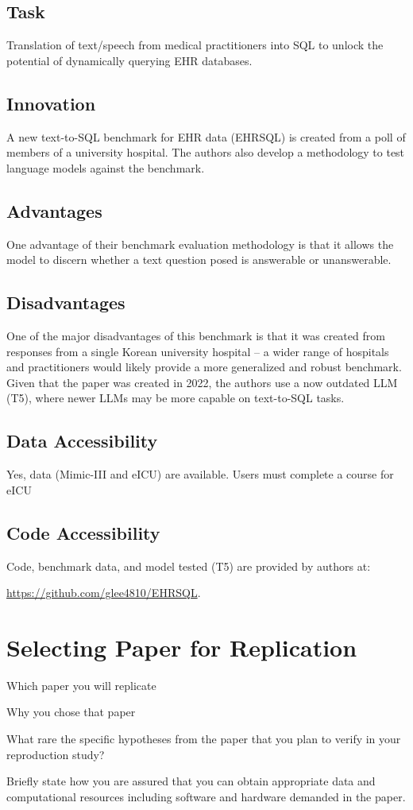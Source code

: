 \documentclass[
	letterpaper, %
]{jdf}
\begin{document}
\subsection{Task}
Translation of text/speech from medical practitioners into SQL to unlock the potential of dynamically querying EHR databases. 
\subsection{Innovation}
A new text-to-SQL benchmark for EHR data (EHRSQL) is created from a poll of members of a university hospital. The authors also develop a methodology to test language models against the benchmark. 
\subsection{Advantages}
One advantage of their benchmark evaluation methodology is that it allows the model to discern whether a text question posed is answerable or unanswerable.
\subsection{Disadvantages}
One of the major disadvantages of this benchmark is that it was created from responses from a single Korean university hospital -- a wider range of hospitals and practitioners would likely provide a more generalized and robust benchmark. Given that the paper was created in 2022, the authors use a now outdated LLM (T5), where newer LLMs may be more capable on text-to-SQL tasks.
\subsection{Data Accessibility}
Yes, data (Mimic-III and eICU) are available. Users must complete a course for eICU
\subsection{Code Accessibility}
Code, benchmark data, and model tested (T5) are provided by authors at:

\href{https://github.com/glee4810/EHRSQL}{https://github.com/glee4810/EHRSQL}.

\section{Selecting Paper for Replication}

Which paper you will replicate

Why you chose that paper

What rare the specific hypotheses from the paper that you plan to verify in your reproduction study?

Briefly state how you are assured that you can obtain appropriate data and computational resources including software and hardware demanded in the paper. \cite{scientific_study_of_languages}

\printbibliography{}
\end{document}
